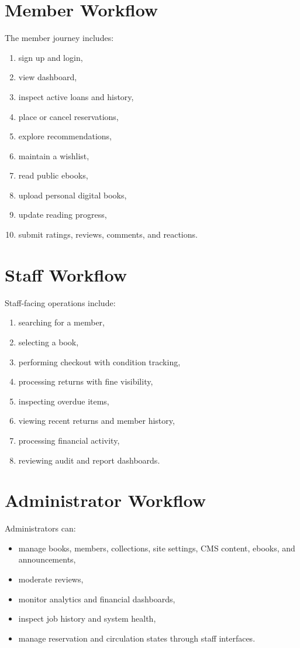 \documentclass[12pt,a4paper]{report}
\begin{document}
\section{Member Workflow}
The member journey includes:
\begin{enumerate}[leftmargin=1.5em]
    \item sign up and login,
    \item view dashboard,
    \item inspect active loans and history,
    \item place or cancel reservations,
    \item explore recommendations,
    \item maintain a wishlist,
    \item read public ebooks,
    \item upload personal digital books,
    \item update reading progress,
    \item submit ratings, reviews, comments, and reactions.
\end{enumerate}

\section{Staff Workflow}
Staff-facing operations include:
\begin{enumerate}[leftmargin=1.5em]
    \item searching for a member,
    \item selecting a book,
    \item performing checkout with condition tracking,
    \item processing returns with fine visibility,
    \item inspecting overdue items,
    \item viewing recent returns and member history,
    \item processing financial activity,
    \item reviewing audit and report dashboards.
\end{enumerate}

\section{Administrator Workflow}
Administrators can:
\begin{itemize}[leftmargin=1.5em]
    \item manage books, members, collections, site settings, CMS content, ebooks, and announcements,
    \item moderate reviews,
    \item monitor analytics and financial dashboards,
    \item inspect job history and system health,
    \item manage reservation and circulation states through staff interfaces.
\end{itemize}
\end{document}
